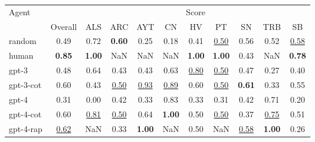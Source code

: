 \begin{tabular}{lcccccccccc}
\toprule
Agent &  & \multicolumn{9}{c}{Score} \\
\cmidrule(lr){2-11}
 &  Overall & ALS & ARC & AYT & CN & HV & PT & SN & TRB & SB \\
\midrule
random & 0.49 & 0.72 & \textbf{0.60} & 0.25 & 0.18 & 0.41 & \underline{0.50} & 0.56 & 0.52 & \underline{0.58} \\
human & \textbf{0.85} & \textbf{1.00} & NaN & NaN & NaN & \textbf{1.00} & \textbf{1.00} & 0.43 & NaN & \textbf{0.78} \\
gpt-3 & 0.48 & 0.64 & 0.43 & 0.43 & 0.63 & \underline{0.80} & \underline{0.50} & 0.47 & 0.27 & 0.40 \\
gpt-3-cot & 0.60 & 0.43 & \underline{0.50} & \underline{0.93} & \underline{0.89} & 0.60 & \underline{0.50} & \textbf{0.61} & 0.33 & 0.55 \\
gpt-4 & 0.31 & 0.00 & 0.42 & 0.33 & 0.83 & 0.33 & 0.31 & 0.42 & 0.71 & 0.20 \\
gpt-4-cot & 0.60 & \underline{0.81} & \underline{0.50} & 0.64 & \textbf{1.00} & 0.50 & \underline{0.50} & 0.37 & \underline{0.75} & 0.51 \\
gpt-4-rap & \underline{0.62} & NaN & 0.33 & \textbf{1.00} & NaN & 0.50 & NaN & \underline{0.58} & \textbf{1.00} & 0.26 \\
\bottomrule
\end{tabular}
